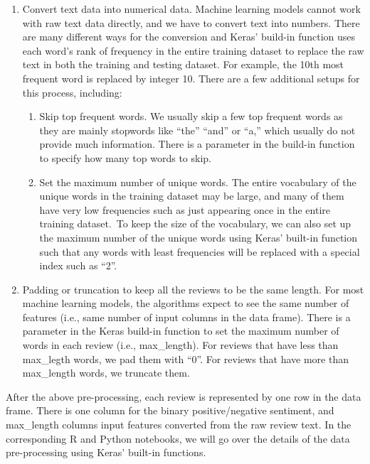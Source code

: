 \documentclass[12pt,]{krantz}
\providecommand{\tightlist}{%
  \setlength{\itemsep}{0pt}\setlength{\parskip}{0pt}}
\begin{document}
\begin{enumerate}
\def\labelenumi{\arabic{enumi}.}
\tightlist
\item
  Convert text data into numerical data. Machine learning models cannot work with raw text data directly, and we have to convert text into numbers. There are many different ways for the conversion and Keras' build-in function uses each word's rank of frequency in the entire training dataset to replace the raw text in both the training and testing dataset. For example, the 10th most frequent word is replaced by integer 10. There are a few additional setups for this process, including:

  \begin{enumerate}
  \def\labelenumii{\alph{enumii}.}
  \tightlist
  \item
    Skip top frequent words. We usually skip a few top frequent words as they are mainly stopwords like ``the'' ``and'' or ``a,'' which usually do not provide much information. There is a parameter in the build-in function to specify how many top words to skip.\\
  \item
    Set the maximum number of unique words. The entire vocabulary of the unique words in the training dataset may be large, and many of them have very low frequencies such as just appearing once in the entire training dataset.~To keep the size of the vocabulary, we can also set up the maximum number of the unique words using Keras' built-in function such that any words with least frequencies will be replaced with a special index such as ``2''.
  \end{enumerate}
\item
  Padding or truncation to keep all the reviews to be the same length. For most machine learning models, the algorithms expect to see the same number of features (i.e., same number of input columns in the data frame). There is a parameter in the Keras build-in function to set the maximum number of words in each review (i.e., max\_length). For reviews that have less than max\_legth words, we pad them with ``0''. For reviews that have more than max\_length words, we truncate them.
\end{enumerate}

After the above pre-processing, each review is represented by one row in the data frame. There is one column for the binary positive/negative sentiment, and max\_length columns input features converted from the raw review text. In the corresponding R and Python notebooks, we will go over the details of the data pre-processing using Keras' built-in functions.
\end{document}
